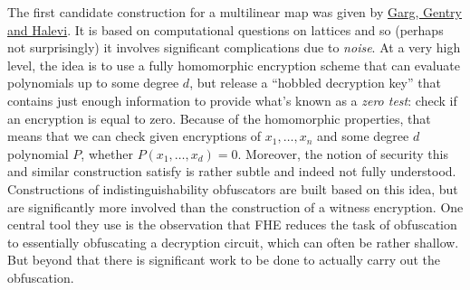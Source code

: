 The first candidate construction for a multilinear map was given by
\href{https://eprint.iacr.org/2012/610}{Garg, Gentry and Halevi}. It is
based on computational questions on lattices and so (perhaps not
surprisingly) it involves significant complications due to \emph{noise}.
At a very high level, the idea is to use a fully homomorphic encryption
scheme that can evaluate polynomials up to some degree \(d\), but
release a ``hobbled decryption key'' that contains just enough
information to provide what's known as a \emph{zero test}: check if an
encryption is equal to zero. Because of the homomorphic properties, that
means that we can check given encryptions of \(x_1,\ldots,x_n\) and some
degree \(d\) polynomial \(P\), whether \(P(x_1,\ldots,x_d)=0\).
Moreover, the notion of security this and similar construction satisfy
is rather subtle and indeed not fully understood. Constructions of
indistinguishability obfuscators are built based on this idea, but are
significantly more involved than the construction of a witness
encryption. One central tool they use is the observation that FHE
reduces the task of obfuscation to essentially obfuscating a decryption
circuit, which can often be rather shallow. But beyond that there is
significant work to be done to actually carry out the obfuscation.
